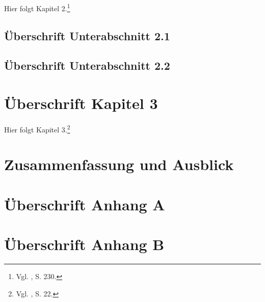 \documentclass[a4paper,12pt]{article}
\let\footnoteOld\footnote		%
\renewcommand{\footnote}[1]{\linespread{1.0}\footnoteOld{#1}\linespread{1.2}}		%
\begin{document}
Hier folgt Kapitel 2.\footnote{Vgl. \citet{Cox1979}, S. 230.}

\subsection{Überschrift Unterabschnitt 2.1\label{sec:ab21}}

\subsection{Überschrift Unterabschnitt 2.2\label{sec:ab22}}

\section{Überschrift Kapitel 3\label{sec:kap3}}

Hier folgt Kapitel 3.\footnote{Vgl. \citet{Skantze2000}, S. 22.}

\newpage

\section{Zusammenfassung und Ausblick\label{sec:outlook}}

\newpage
{}  %



\newpage

\appendix
\section{Überschrift Anhang A\label{sec:anhangA}}
\newpage
\section{Überschrift Anhang B\label{sec:anhangB}}
\newpage \thispagestyle{empty}
\end{document}

